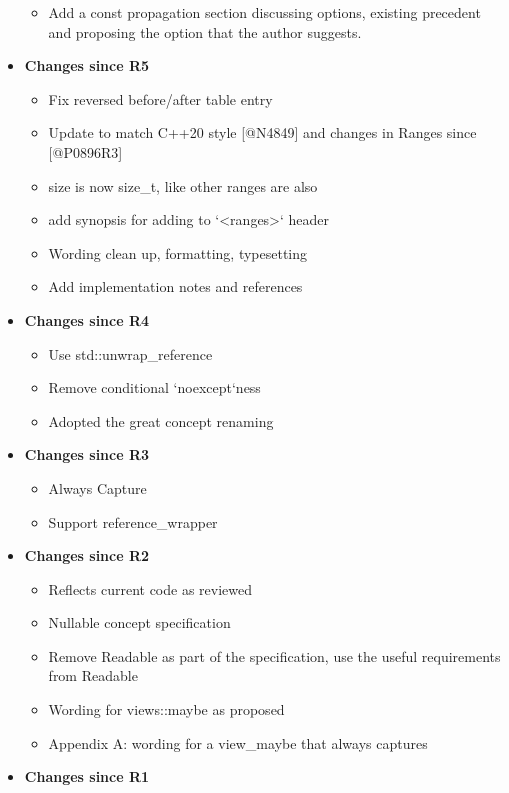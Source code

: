 \documentclass[a4paper,10pt,oneside,openany,final,article]{memoir}
\begin{document}
\begin{itemize}
\begin{itemize}
  \item Add a const propagation section discussing options, existing precedent and proposing the option that the author suggests.
  \end{itemize}
\item \textbf{Changes since R5}
  \begin{itemize}
  \item Fix reversed before/after table entry
  \item Update to match C++20 style [@N4849] and changes in Ranges since [@P0896R3]
  \item size is now size_t, like other ranges are also
  \item add synopsis for adding to `<ranges>` header
  \item Wording clean up, formatting, typesetting
  \item Add implementation notes and references
  \end{itemize}
\item \textbf{Changes since R4}
  \begin{itemize}
  \item Use std::unwrap\_reference
  \item Remove conditional `noexcept`ness
  \item Adopted the great concept renaming
  \end{itemize}
\item \textbf{Changes since R3}
  \begin{itemize}
  \item Always Capture
  \item Support reference\_wrapper
  \end{itemize}
\item \textbf{Changes since R2}
  \begin{itemize}
  \item Reflects current code as reviewed
  \item Nullable concept specification
  \item Remove Readable as part of the specification, use the useful requirements from Readable
  \end{itemize}
  \begin{itemize}
  \item Wording for views::maybe as proposed
  \item Appendix A: wording for a view\_maybe that always captures
  \end{itemize}
\item \textbf{Changes since R1}
  \begin{itemize}

\end{itemize}
\end{itemize}
\end{document}
